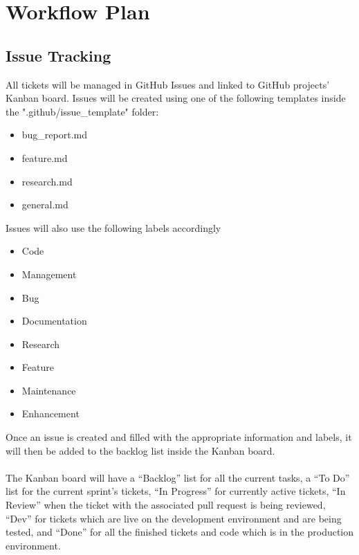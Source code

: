\documentclass{article}
\begin{document}
\section{Workflow Plan}
\subsection{Issue Tracking}
All tickets will be managed in GitHub Issues and linked to GitHub projects' Kanban board. Issues will be created using one of the following templates inside the ".github/issue\_template" folder:
\begin{itemize}
\item bug\_report.md
\item feature.md
\item research.md
\item general.md
\end{itemize}
Issues will also use the following labels accordingly
\begin{itemize}
\item Code
\item Management
\item Bug
\item Documentation
\item Research
\item Feature
\item Maintenance
\item Enhancement
\end{itemize}

Once an issue is created and filled with the appropriate information and labels, it will then be
added to the backlog list inside the Kanban board.\\\\
The Kanban board will have a “Backlog” list for all the current tasks, a “To Do” list for the current
sprint’s tickets, “In Progress” for currently active tickets, “In Review” when the ticket with the
associated pull request is being reviewed, “Dev” for tickets which are live on the development
environment and are being tested, and “Done” for all the finished tickets and code which is in
the production environment.
\end{document}
